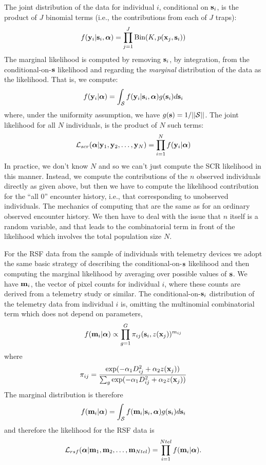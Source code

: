 \documentclass[12pt]{article}
\begin{document}
The joint distribution of the data for
individual $i$, conditional on ${\bf s}_{i}$, is the product of $J$
binomial terms (i.e., the contributions from each of $J$ traps):
\[
  f({\bf y}_{i} | {\bf s}_{i} , {\bm \alpha}) =
  \prod_{j=1}^{J} \mbox{Bin}(K, p({\bf x}_{j},{\bf s}_{i}) )
\]
The marginal likelihood \citep{borchers_efford:2008} is
computed by removing ${\bf s}_{i}$, by integration, from the
conditional-on-${\bf s}$ likelihood and regarding the {\it marginal}
distribution of the data as the likelihood. That is, we compute:
\[
  f({\bf y}_{i}|{\bm \alpha}) =
\int_{{\cal S}}  f( {\bf y}_{i} |{\bf s}_{i},{\bm \alpha}) g({\bf s}_{i}) d{\bf s}_{i}
\]
{\flushleft where}, under the uniformity assumption, we have
$g({\bf s}) = 1/||{\cal S}||$.
The joint likelihood for all $N$ individuals,
is the product of $N$ such terms:
\[
{\cal L}_{scr}({\bm \alpha} | {\bf y}_{1},{\bf y}_{2},\ldots, {\bf y}_{N}) = \prod_{i=1}^{N}
f({\bf y}_{i}|{\bm \alpha})
\]
In practice, we don't know $N$ and so we can't just compute the
SCR likelihood in this manner. Instead,
we compute the contributions of the
$n$ observed individuals directly as given above,
but then we have to compute the likelihood
contribution for the ``all 0'' encounter history, i.e., that
corresponding to unobserved individuals. The mechanics of computing
that are the same as for an ordinary observed encounter history. We
then have to deal with the issue that $n$ itself is a random variable,
and that leads to the combinatorial term in front of the likelihood
which involves the total population size $N$.

For the RSF data from the sample of individuals with telemetry devices
we adopt the same basic strategy of describing the
conditional-on-${\bf s}$ likelihood and then computing the marginal
likelihood by averaging over possible values of ${\bf s}$.
We have ${\bf m}_{i}$, the vector of pixel counts for individual $i$,
where these counts are derived from a telemetry study or similar.
The conditional-on-${\bf s}_{i}$ distribution of the telemetry data
from individual $i$ is, omitting the multinomial combinatorial term which does not
depend on parameters,
\[
 f({\bf m}_{i}  | {\bm \alpha} ) \propto
\prod_{g=1}^{G}  \pi_{ij}({\bf s}_{i},z({\bf x}_{j})) ^{m_{ij}}
\]
where
\[
 \pi_{ij}  = \frac{ \exp( -\alpha_{1} D_{ij}^{2} +\alpha_{2} z({\bf x}_{j}) ) }
{ \sum_{g} \exp(-\alpha_{1} D_{ij}^{2} +\alpha_{2} z({\bf x}_{j}))}
\]
The marginal distribution is therefore
\[
f({\bf m}_{i}|{\bm \alpha}) =    \int_{{\cal S}}  f({\bf m}_{i} |{\bf s}_{i},{\bm \alpha}) g({\bf s}_{i}) d{\bf s}_{i}
\]
and therefore the likelihood for the RSF data is
\[
{\cal L}_{rsf}({\bm \alpha} | {\bf m}_{1},{\bf m}_{2},\ldots, {\bf m}_{Ntel}) = \prod_{i=1}^{Ntel}
f({\bf m}_{i}|{\bm \alpha}).
\]
\end{document}
